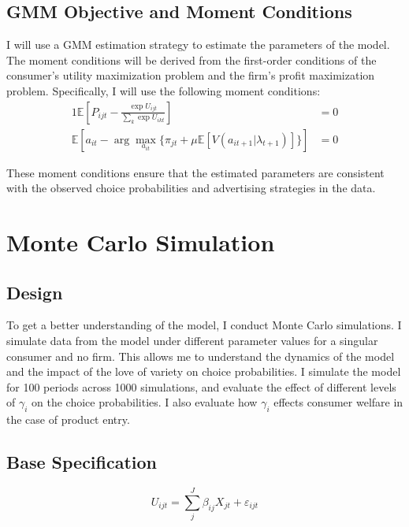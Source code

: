 \documentclass[12pt]{article}
\begin{document}
    \subsection{GMM Objective and Moment Conditions}

      I will use a GMM estimation strategy to estimate the parameters of the model. The moment conditions will be derived from the first-order conditions of the consumer's utility maximization problem and the firm's profit maximization problem. Specifically, I will use the following moment conditions:
      \begin{alignat*}{1}
        \mathbb{E}[P_{ijt} - \frac{\exp{U_{ijt}}}{\sum_k\exp{U_{ikt}}}] &= 0 \\
        \mathbb{E}[a_{it} - \arg\max_{a_{it}} \{\pi_{jt} + \mu \mathbb{E}[V(a_{it+1} | \lambda_{t+1})]\}] &= 0
      \end{alignat*}

        These moment conditions ensure that the estimated parameters are consistent with the observed choice probabilities and advertising strategies in the data.

\section{Monte Carlo Simulation}

    \subsection{Design}
    To get a better understanding of the model, I conduct Monte Carlo simulations. I simulate data from the model under different parameter values for a singular consumer and no firm. This allows me to understand the dynamics of the model and the impact of the love of variety on choice probabilities. I simulate the model for 100 periods across 1000 simulations, and evaluate the effect of different levels of $\gamma_i$ on the choice probabilities. I also evaluate how $\gamma_i$ effects consumer welfare in the case of product entry.

    \subsection{Base Specification}

    \begin{equation}
      U_{ijt} = \sum_{j}^J\beta_{ij} X_{jt} + \varepsilon_{ijt}
    \end{equation}
\end{document}

